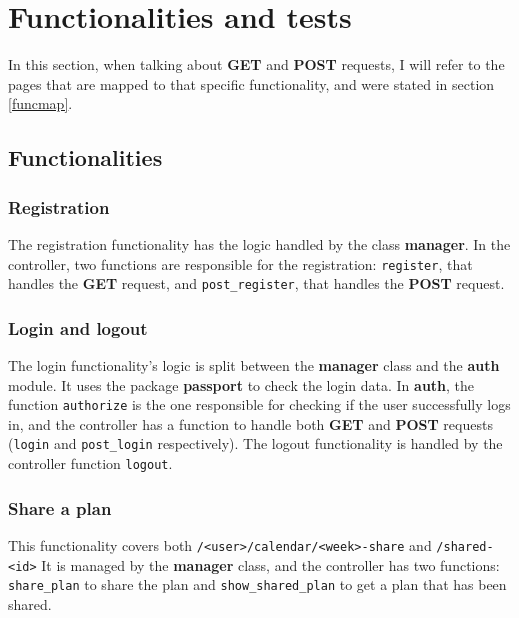 \documentclass[12pt,twoside,titlepage,a4paper]{article}
\theoremstyle{definicion}
\theoremstyle{lema}
\theoremstyle{teorema}
\theoremstyle{corolario}
\theoremstyle{ejemplo}
\theoremstyle{nota}
\begin{document}
\section{Functionalities and tests}

In this section, when talking about \textbf{GET} and \textbf{POST} requests, I will refer to the pages that are mapped to that
specific functionality, and were stated in section \ref{funcmap}.

\subsection{Functionalities}

\subsubsection{Registration}

The registration functionality has the logic handled by the class \textbf{manager}. In the controller, two functions are responsible
for the registration: \texttt{register}, that handles the \textbf{GET} request, and \texttt{post\_register}, that handles the
\textbf{POST} request.

\subsubsection{Login and logout}

The login functionality's logic is split between the \textbf{manager} class and the \textbf{auth} module. It uses the package
\textbf{passport} to check the login data. In \textbf{auth}, the function \texttt{authorize} is the one responsible for checking
if the user successfully logs in, and the controller has a function to handle both \textbf{GET} and \textbf{POST} requests 
(\texttt{login} and \texttt{post\_login} respectively). The logout functionality is handled by the controller function \texttt{logout}.

\subsubsection{Share a plan}

This functionality covers both \texttt{/<user>/calendar/<week>-share} and \texttt{/shared-<id>} It is managed by the \textbf{manager}
class, and the controller has two functions: \texttt{share\_plan} to share the plan and \texttt{show\_shared\_plan} to get a plan that
has been shared.
\end{document}
